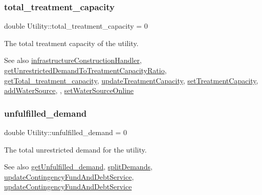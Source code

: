\subsubsection{\texorpdfstring{total\+\_\+treatment\+\_\+capacity}{total\_treatment\_capacity}}
{\footnotesize\ttfamily double Utility\+::total\+\_\+treatment\+\_\+capacity = 0\hspace{0.3cm}{\ttfamily [private]}}



The total treatment capacity of the utility. 

\begin{DoxySeeAlso}{See also}
\mbox{\hyperlink{classUtility_ae93114986578d3d3fbae56f271ac7df6}{infrastructure\+Construction\+Handler}}, \mbox{\hyperlink{classUtility_a73afadbbcd2d1a21452937b514d10c34}{get\+Unrestricted\+Demand\+To\+Treatment\+Capacity\+Ratio}}, \mbox{\hyperlink{classUtility_a6ab2e5b8aec47bcfed522c98ea1b5f79}{get\+Total\+\_\+treatment\+\_\+capacity}}, \mbox{\hyperlink{classUtility_ae0134c9627b79067e1789c95c775570d}{update\+Treatment\+Capacity}}, \mbox{\hyperlink{classUtility_ae2dd2175d9fe1d71ea1f1e8b43a21148}{set\+Treatment\+Capacity}}, \mbox{\hyperlink{classUtility_aebbfd65c13e86cfeda8bdfbcc6712587}{add\+Water\+Source}}, , \mbox{\hyperlink{classUtility_ae01127adf3c99415310e77b22bd9f3b5}{set\+Water\+Source\+Online}} 
\end{DoxySeeAlso}
\mbox{\label{classUtility_a42e3f519823e668f9b8affb700e07d86}} 
\subsubsection{\texorpdfstring{unfulfilled\+\_\+demand}{unfulfilled\_demand}}
{\footnotesize\ttfamily double Utility\+::unfulfilled\+\_\+demand = 0\hspace{0.3cm}{\ttfamily [private]}}



The total unrestricted demand for the utility. 

\begin{DoxySeeAlso}{See also}
\mbox{\hyperlink{classUtility_a062fd9a622bd9893c142ae56523010dd}{get\+Unfulfilled\+\_\+demand}}, \mbox{\hyperlink{classUtility_aca42b14087c3184d4fec10a2e8729c05}{split\+Demands}}, \mbox{\hyperlink{classUtility_ab663efd526505a3d843cae7075cc3b91}{update\+Contingency\+Fund\+And\+Debt\+Service}}, \mbox{\hyperlink{classUtility_ab663efd526505a3d843cae7075cc3b91}{update\+Contingency\+Fund\+And\+Debt\+Service}} 
\end{DoxySeeAlso}
\mbox{\label{classUtility_a5f981ceeba0b50298b5ad2d463bf4f40}} 
